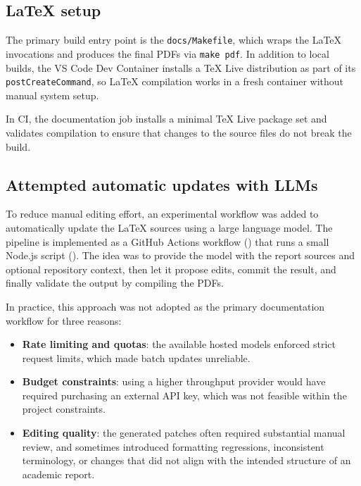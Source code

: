 \documentclass[12pt]{report}
\begin{document}
\subsection{LaTeX setup}

The primary build entry point is the \texttt{docs/Makefile}, which wraps the LaTeX
invocations and produces the final PDFs via \texttt{make pdf}. In addition to local builds,
the VS Code Dev Container installs a TeX Live distribution as part of its
\texttt{postCreateCommand}, so LaTeX compilation works in a fresh container without manual
system setup.

In CI, the documentation job installs a minimal TeX Live package set and validates
compilation to ensure that changes to the source files do not break the build.

\subsection{Attempted automatic updates with LLMs}

To reduce manual editing effort, an experimental workflow was added to automatically update
the LaTeX sources using a large language model. The pipeline is implemented as a GitHub
Actions workflow () that runs a small Node.js
script (). The idea was to provide the model with the
report sources and optional repository context, then let it propose edits, commit the
result, and finally validate the output by compiling the PDFs.

In practice, this approach was not adopted as the primary documentation workflow for three
reasons:

\begin{itemize}
    \item \textbf{Rate limiting and quotas}: the available hosted models enforced strict
          request limits, which made batch updates unreliable.
    \item \textbf{Budget constraints}: using a higher throughput provider would have
          required purchasing an external API key, which was not feasible within the
          project constraints.
    \item \textbf{Editing quality}: the generated patches often required substantial manual
          review, and sometimes introduced formatting regressions, inconsistent terminology,
          or changes that did not align with the intended structure of an academic report.
\end{itemize}
\end{document}
